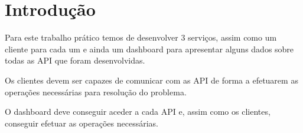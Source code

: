 \chapter{Introdução}

Para este trabalho prático temos de desenvolver 3 serviços, assim como um cliente para cada um e ainda um dashboard para apresentar alguns dados sobre todas as API que foram desenvolvidas.

Os clientes devem ser capazes de comunicar com as API de forma a efetuarem as operações necessárias para resolução do problema.

O dashboard deve conseguir aceder a cada API e, assim como os clientes, conseguir efetuar as operações necessárias.